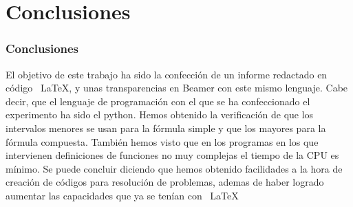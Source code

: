 \documentclass{beamer}
\begin{document}
\section{Conclusiones}

\begin{frame}
\frametitle{Conclusiones}

El objetivo de este trabajo ha sido la confección de un informe redactado en código ~\LaTeX, y unas transparencias en Beamer con este mismo lenguaje. 
Cabe decir, que el lenguaje de programación con el que se ha confeccionado el experimento ha sido el python.
Hemos obtenido la verificación de que los intervalos menores se usan para la fórmula simple y 
que los mayores para la fórmula compuesta.
También hemos visto que en los programas en los que intervienen definiciones de funciones no muy complejas el tiempo de la CPU es mínimo.
Se puede concluir diciendo que hemos obtenido facilidades a la hora de creación de códigos para resolución de problemas, ademas de haber 
logrado aumentar las capacidades que ya se tenían con ~\LaTeX
\end{frame}
\end{document}
